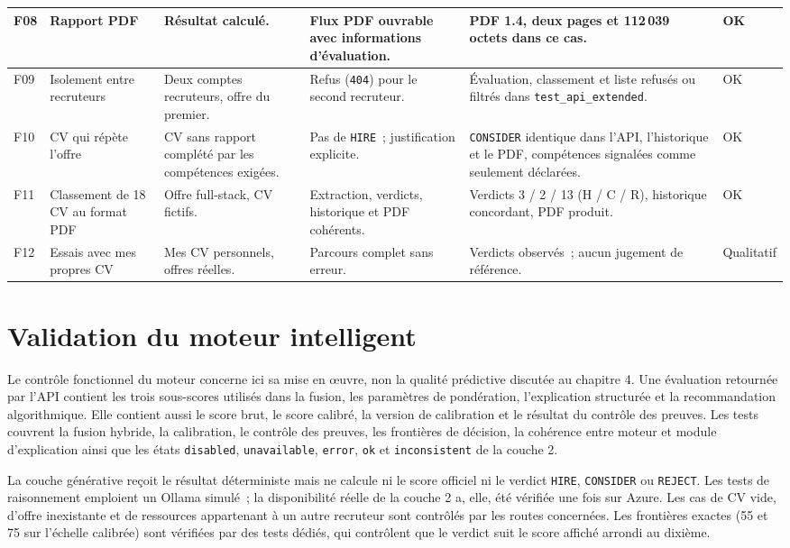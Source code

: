 {\begin{longtable}{|p{}|p{}|p{}|p{}|p{}|p{}|}
\hline
F08 & Rapport PDF & Résultat calculé. & Flux PDF ouvrable avec informations d'évaluation. & PDF 1.4, deux pages et 112\,039 octets dans ce cas. & OK\\
\hline
F09 & Isolement entre recruteurs & Deux comptes recruteurs, offre du premier. & Refus (\texttt{404}) pour le second recruteur. & Évaluation, classement et liste refusés ou filtrés dans \texttt{test\_api\_extended}. & OK\\
\hline
F10 & CV qui répète l'offre & CV sans rapport complété par les compétences exigées. & Pas de \texttt{HIRE}~; justification explicite. & \texttt{CONSIDER} identique dans l'API, l'historique et le PDF, compétences signalées comme seulement déclarées. & OK\\
\hline
F11 & Classement de 18 CV au format PDF & Offre full-stack, CV fictifs. & Extraction, verdicts, historique et PDF cohérents. & Verdicts 3 / 2 / 13 (H / C / R), historique concordant, PDF produit. & OK\\
\hline
F12 & Essais avec mes propres CV & Mes CV personnels, offres réelles. & Parcours complet sans erreur. & Verdicts observés~; aucun jugement de référence. & Qualitatif\\
\hline
\end{longtable}
}

\section{Validation du moteur intelligent}

Le contrôle fonctionnel du moteur concerne ici sa mise en œuvre, non la qualité prédictive discutée au chapitre 4. Une évaluation retournée par l'API contient les trois sous-scores utilisés dans la fusion, les paramètres de pondération, l'explication structurée et la recommandation algorithmique. Elle contient aussi le score brut, le score calibré, la version de calibration et le résultat du contrôle des preuves. Les tests couvrent la fusion hybride, la calibration, le contrôle des preuves, les frontières de décision, la cohérence entre moteur et module d'explication ainsi que les états \texttt{disabled}, \texttt{unavailable}, \texttt{error}, \texttt{ok} et \texttt{inconsistent} de la couche 2.

La couche générative reçoit le résultat déterministe mais ne calcule ni le score officiel ni le verdict \texttt{HIRE}, \texttt{CONSIDER} ou \texttt{REJECT}. Les tests de raisonnement emploient un Ollama simulé~; la disponibilité réelle de la couche 2 a, elle, été vérifiée une fois sur Azure. Les cas de CV vide, d'offre inexistante et de ressources appartenant à un autre recruteur sont contrôlés par les routes concernées. Les frontières exactes (55 et 75 sur l'échelle calibrée) sont vérifiées par des tests dédiés, qui contrôlent que le verdict suit le score affiché arrondi au dixième.

